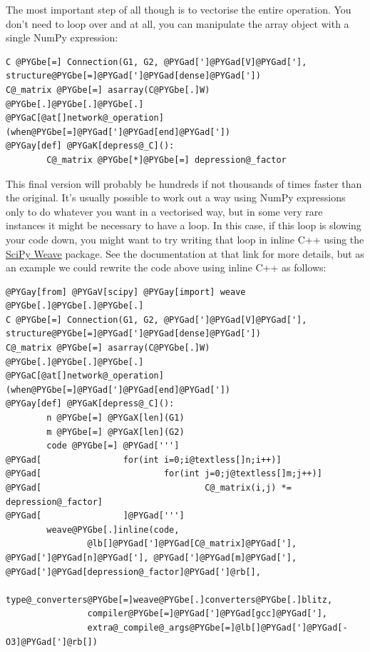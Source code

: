 \documentclass[letterpaper,10pt,english]{manual}
\begin{document}
The most important step of all though is to vectorise the entire operation. You
don't need to loop over  and  at all, you can manipulate the array
object with a single NumPy expression:

\begin{Verbatim}[commandchars=@\[\]]
C @PYGbe[=] Connection(G1, G2, @PYGad[']@PYGad[V]@PYGad['], structure@PYGbe[=]@PYGad[']@PYGad[dense]@PYGad['])
C@_matrix @PYGbe[=] asarray(C@PYGbe[.]W)
@PYGbe[.]@PYGbe[.]@PYGbe[.]
@PYGaC[@at[]network@_operation](when@PYGbe[=]@PYGad[']@PYGad[end]@PYGad['])
@PYGay[def] @PYGaK[depress@_C]():
        C@_matrix @PYGbe[*]@PYGbe[=] depression@_factor
\end{Verbatim}

This final version will probably be hundreds if not thousands of times faster
than the original. It's usually possible to work out a way using NumPy
expressions only to do whatever you want in a vectorised way, but in some
very rare instances it might be necessary to have a loop. In this case, if
this loop is slowing your code down, you might want to try writing that
loop in inline C++ using the \href{http://www.scipy.org/Weave}{SciPy Weave}
package. See the documentation at that link for more details, but as an
example we could rewrite the code above using inline C++ as follows:

\begin{Verbatim}[commandchars=@\[\]]
@PYGay[from] @PYGaV[scipy] @PYGay[import] weave
@PYGbe[.]@PYGbe[.]@PYGbe[.]
C @PYGbe[=] Connection(G1, G2, @PYGad[']@PYGad[V]@PYGad['], structure@PYGbe[=]@PYGad[']@PYGad[dense]@PYGad['])
C@_matrix @PYGbe[=] asarray(C@PYGbe[.]W)
@PYGbe[.]@PYGbe[.]@PYGbe[.]
@PYGaC[@at[]network@_operation](when@PYGbe[=]@PYGad[']@PYGad[end]@PYGad['])
@PYGay[def] @PYGaK[depress@_C]():
        n @PYGbe[=] @PYGaX[len](G1)
        m @PYGbe[=] @PYGaX[len](G2)
        code @PYGbe[=] @PYGad[''']
@PYGad[                for(int i=0;i@textless[]n;i++)]
@PYGad[                        for(int j=0;j@textless[]m;j++)]
@PYGad[                                C@_matrix(i,j) *= depression@_factor]
@PYGad[                ]@PYGad[''']
        weave@PYGbe[.]inline(code,
                @lb[]@PYGad[']@PYGad[C@_matrix]@PYGad['], @PYGad[']@PYGad[n]@PYGad['], @PYGad[']@PYGad[m]@PYGad['], @PYGad[']@PYGad[depression@_factor]@PYGad[']@rb[],
                type@_converters@PYGbe[=]weave@PYGbe[.]converters@PYGbe[.]blitz,
                compiler@PYGbe[=]@PYGad[']@PYGad[gcc]@PYGad['],
                extra@_compile@_args@PYGbe[=]@lb[]@PYGad[']@PYGad[-O3]@PYGad[']@rb[])
\end{Verbatim}
\end{document}
